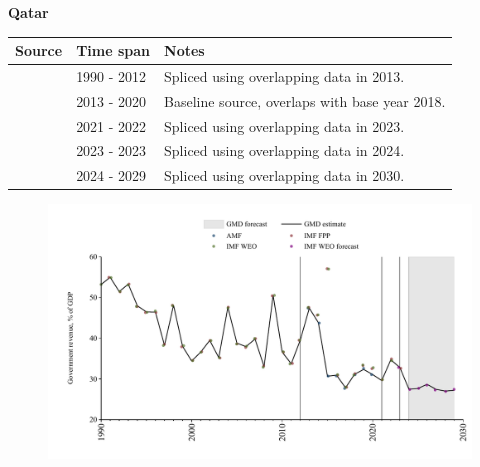 \documentclass[12pt,a4paper,landscape]{article}
\begin{document}
\begin{adjustbox}{max totalsize={\paperwidth}{\paperheight},center}
\begin{minipage}[t][\textheight][t]{\textwidth}
\vspace*{0.5cm}
{}
\begin{center}
{\Large\bfseries Qatar}
\end{center}
\vspace{0.5cm}
\begin{table}[H]
\centering
\small
\begin{tabular}{|l|l|l|}
\hline
\textbf{Source} & \textbf{Time span} & \textbf{Notes} \\
\hline
\rowcolor{white}\cite{IMF_WEO}& 1990 - 2012 &Spliced using overlapping data in 2013.\\
\rowcolor{lightgray}\cite{AMF}& 2013 - 2020 &Baseline source, overlaps with base year 2018.\\
\rowcolor{white}\cite{IMF_WEO}& 2021 - 2022 &Spliced using overlapping data in 2023.\\
\rowcolor{lightgray}\cite{IMF_FPP}& 2023 - 2023 &Spliced using overlapping data in 2024.\\
\rowcolor{white}\cite{IMF_WEO_forecast}& 2024 - 2029 &Spliced using overlapping data in 2030.\\
\hline
\end{tabular}
\end{table}
\begin{figure}[H]
\centering
\includegraphics[width=\textwidth,height=0.6\textheight,keepaspectratio]{graphs/QAT_govrev_GDP.pdf}
\end{figure}
\end{minipage}
\end{adjustbox}
\end{document}
